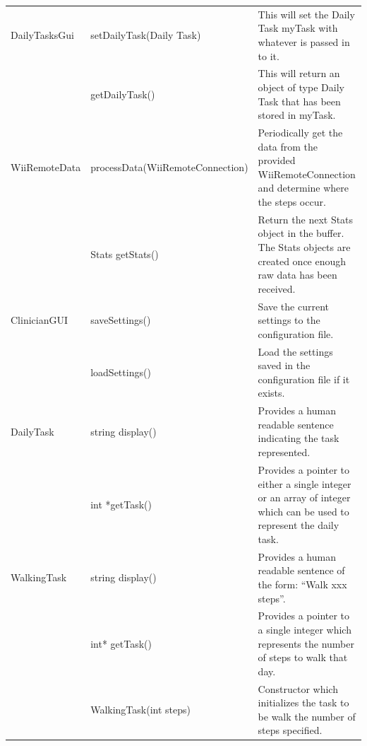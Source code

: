 \documentclass{article}
\begin{document}
\begin{longtable}[t]{|p{1.5in}|p{2in}|p{2.5in}|}
\hline %

DailyTasksGui
      & setDailyTask(Daily Task) & This will set the Daily Task myTask with whatever is passed in to it. \\
\cline{2-3}
      & getDailyTask() & This will return an object of type Daily Task that has been stored in myTask. \\
\hline %

WiiRemoteData
			& processData\newline(WiiRemoteConnection) & Periodically get the data from the provided WiiRemoteConnection and determine where the steps occur. \\
			\cline{2-3}
			& Stats getStats() & Return the next Stats object in the buffer. The Stats objects are created once enough raw data has been received. \\

\hline


ClinicianGUI

			& saveSettings() & Save the current settings to the configuration file. \\
			\cline{2-3}
			& loadSettings() & Load the settings saved in the configuration file if it exists. \\
\hline

DailyTask
			& string display() & Provides a human readable sentence indicating the task represented.\\
			\cline{2-3}
			
			& int *getTask() & Provides a pointer to either a single integer or an array of integer which can be used to represent the daily task. \\
			\cline{2-3}
			
\hline

WalkingTask
			& string display() & Provides a human readable sentence of the form: ``Walk xxx steps''. \\
			\cline{2-3}
			
			& int* getTask() & Provides a pointer to a single integer which represents the number of steps to walk that day. \\
			\cline{2-3}
			
			& WalkingTask(int steps) & Constructor which initializes the task to be walk the number of steps specified. \\
			
\hline

\end{longtable}
\end{document}
